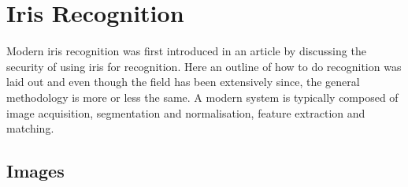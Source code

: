 \section{Iris Recognition}
\label{sec:Iris_Recognition_Research}
Modern iris recognition was first introduced in an article by \cite{Daugman1993} discussing the security of using iris for recognition. Here an outline of how to do recognition was laid out and even though the field has been extensively  since, the general methodology is more or less the same. A modern system is typically composed of image acquisition, segmentation and normalisation, feature extraction and matching. 

\subsection{Images}
